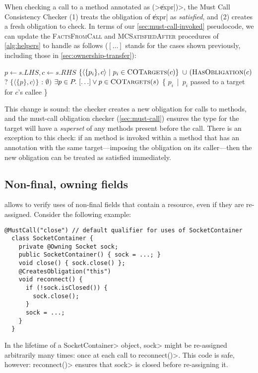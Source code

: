 When checking a call to a method annotated as
\CreatesObligation\<(>\|expr|\<)>, the Must Call Consistency Checker
(1) treats the \MustCall
obligation of \|expr| as \emph{satisfied},
and (2) creates a fresh obligation to check.
%
In terms of our \cref{sec:must-call-invoked} pseudocode,
we can update the \textsc{FactsFromCall} and \textsc{MCSatisfiedAfter} procedures of
\cref{alg:helpers} to handle \CreatesObligation as follows ($[\ldots]$ stands for the cases shown previously,
including those in \cref{sec:ownership-transfer}):
\begin{algorithmic}
  \State $p \gets s.LHS, c \gets s.RHS$
  \State \Return $\{ \langle \{ p_i \}, c \rangle\ |\ p_i \in \textsc{COTargets}(c) \}$ \newline
  \hspace*{5em} $\cup\ (\textsc{HasObligation}(c)$ ? $\{ \langle \{ p \}, c \rangle \}$ : $\emptyset)$
  \EndProcedure
  \State \Return $\exists p \in P .\ [\ldots] \vee p \in \textsc{COTargets}(s)$
  \EndProcedure
  \State \Return \{ $p_i$\ |\ $p_i$ passed to a \CreatesObligation target for $c$'s callee \}
  \EndProcedure
\end{algorithmic}
\noindent
This change is sound: the checker creates a new obligation for calls to
\CreatesObligation methods, and the must-call obligation checker (\cref{sec:must-call}) ensures the
\MustCall type for the target will have a \emph{superset} of any methods present
before the call.
There is an exception to this check: if an \CreatesObligation
method is invoked within a method that has an \CreatesObligation annotation
with the same target---imposing the obligation on its caller---then
the new obligation can be treated as satisfied immediately.

\subsection{Non-final, owning fields}
\label{sec:non-final-owning}

\CreatesObligation allows \tool to verify uses of non-final fields
that contain a resource, even if they are re-assigned. Consider
the following example:

\begin{lstlisting}[frame=tb,belowskip=3mm]
  @MustCall("close") // default qualifier for uses of SocketContainer
  class SocketContainer {
    private @Owning Socket sock;
    public SocketContainer() { sock = ...; } 
    void close() { sock.close() };
    @CreatesObligation("this")
    void reconnect() {
      if (!sock.isClosed()) {
        sock.close();
      }
      sock = ...;
    }
  }
\end{lstlisting}
In the lifetime of a \<SocketContainer> object, \<sock>
might be re-assigned arbitrarily many times: once at each
call to \<reconnect()>. This code is safe, however: \<reconnect()>
ensures that \<sock> is closed before re-assigning it.

